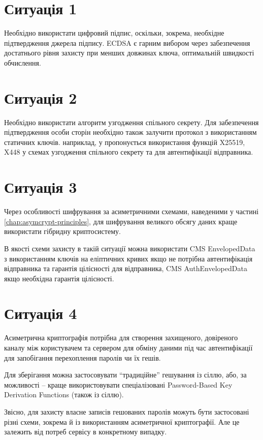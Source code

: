 \documentclass{kpi-lab}
\begin{document}
\section{Ситуація 1}

Необхідно використати цифровий підпис, оскільки, зокрема,
необхідне підтвердження джерела підпису.
ECDSA є гарним вибором через забезпечення достатнього рівня захисту
при менших довжинах ключа, оптимальній швидкості обчислення.

\section{Ситуація 2}

Необхідно використати алгоритм узгодження спільного секрету.
Для забезпечення підтвердження особи сторін необхідно
також залучити протокол з використанням статичних ключів.
наприклад, у \cite{rfc8418} пропонується використання
функцій X25519, X448 у схемах узгодження спільного секрету та
для автентифікації відправника.

\section{Ситуація 3}

Через особливості шифрування за асиметричними схемами,
наведеними у частині \ref{chap:asymcrypt-principles},
для шифрування великого обсягу даних краще використати
гібридну криптосистему.

В якості схеми захисту в такій ситуації можна використати
CMS EnvelopedData з використанням ключів на еліптичних
кривих \cite{rfc5753}
якщо не потрібна автентифікація відправника та гарантія
цілісності для відправника, CMS AuthEnvelopedData \cite{rfc5753}
якщо необхідна гарантія цілісності.

\section{Ситуація 4}

Асиметрична криптографія потрібна для створення захищеного, довіреного
каналу між користувачем та сервером для обміну даними під
час автентифікації для запобігання перехоплення паролів чи їх гешів.

Для зберігання можна застосовувати \enquote{традиційне}
гешування із сіллю, або, за можливості -- краще
використовувати спеціалізовані Password-Based Key
Derivation Functions (також із сіллю).

Звісно, для захисту власне записів гешованих паролів можуть
бути застосовані різні схеми, зокрема й із використанням
асиметричної криптографії. Але це залежить від потреб
сервісу в конкретному випадку.
\end{document}
